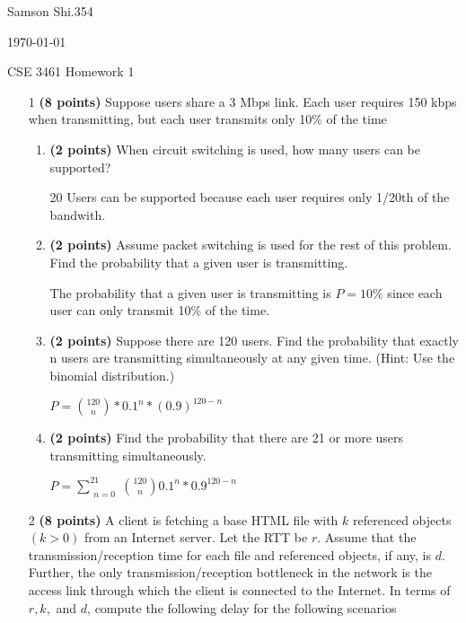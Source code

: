 \documentclass{article}
\begin{document}
\begin{flushright}
Samson Shi.354

\today

CSE 3461 Homework 1
\end{flushright}

\begin{enumerate}

\item[1]\textbf{(8 points)} Suppose users share a 3 Mbps link. Each user requires 150 kbps when transmitting, but each user transmits only 10\% of the time

\begin{enumerate}
  \item \textbf{(2 points)} When circuit switching is used, how many users can be supported? 

    20 Users can be supported because each user requires only 1/20th of the bandwith.

  \item \textbf{(2 points)} Assume packet switching is used for the rest of this problem. Find the probability that a given user is transmitting.

    The probability that a given user is transmitting is $P = 10\%$ since each user can only transmit 10\% of the time. 

  \item \textbf{(2 points)} Suppose there are 120 users. Find the probability that exactly n users are transmitting simultaneously at any given time. (Hint: Use the binomial distribution.)

    $P=\binom{120}{n} * 0.1^n * (0.9)^{120-n}$

  \item \textbf{(2 points)} Find the probability that there are 21 or more users transmitting simultaneously.

    $P = \sum_{\substack{n=0}}^{21} \binom{120}{n}0.1^n * 0.9^{120-n}$

\end{enumerate}

\item[2]\textbf{(8 points)} A client is fetching a base HTML file with $k$ referenced objects $(k > 0)$ from an Internet server. Let the RTT be $r$. Assume that the transmission/reception time for each file and referenced objects, if any, is $d$. Further, the only transmission/reception bottleneck in the network is the access link through which the client is connected to the Internet. In terms of $r, k,$ and $d$, compute the following delay for the following scenarios


\end{enumerate}
\end{document}
